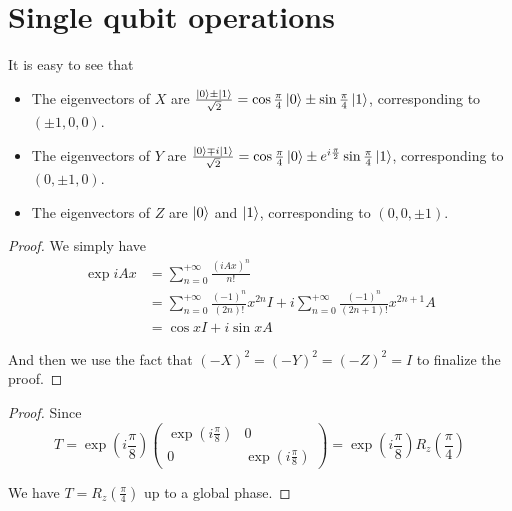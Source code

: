 \documentclass[../main.tex]{subfiles}
\begin{document}
\setcounter{chapter}{4}
\setcounter{section}{1}
\section{Single qubit operations}

\begin{exercise}
\end{exercise}
It is easy to see that
\begin{itemize}
    \item The eigenvectors of $X$ are $\frac{\ket{0}\pm\ket{1}}{\sqrt{2}}=\cos\frac{\pi}{4}\ket{0}\pm\sin\frac{\pi}{4}\ket{1}$, corresponding to $(\pm1,0,0)$.
    \item The eigenvectors of $Y$ are $\frac{\ket{0}\mp i\ket{1}}{\sqrt{2}}=\cos\frac{\pi}{4}\ket{0}\pm e^{i\frac{\pi}{2}}\sin\frac{\pi}{4}\ket{1}$, corresponding to $(0,\pm1,0)$.
    \item The eigenvectors of $Z$ are $\ket{0}$ and $\ket{1}$, corresponding to $(0,0,\pm1)$.
\end{itemize}

\bigskip
\begin{exercise}
\end{exercise}
\begin{proof}
We simply have
\begin{align*}
    \exp{i A x} &= \sum_{n=0}^{+\infty}\frac{(i A x)^n}{n!} \\
    &=\sum_{n=0}^{+\infty}\frac{(-1)^n}{(2n)!}x^{2n}I+i\sum_{n=0}^{+\infty}\frac{(-1)^n}{(2n+1)!}x^{2n+1}A \\
    &= \cos{x} I + i\sin{x} A
\end{align*}

And then we use the fact that $(-X)^2=(-Y)^2=(-Z)^2=I$ to finalize the proof.
\end{proof}

\bigskip
\begin{exercise}
\end{exercise}
\begin{proof}
Since
\begin{equation*}
    T=\exp(i\frac{\pi}{8})\begin{pmatrix}\exp(i\frac{\pi}{8})&0\\0&\exp(i\frac{\pi}{8})\end{pmatrix}=\exp(i\frac{\pi}{8})R_z(\frac{\pi}{4})
\end{equation*}

We have $T=R_z(\frac{\pi}{4})$ up to a global phase.
\end{proof}
\end{document}
